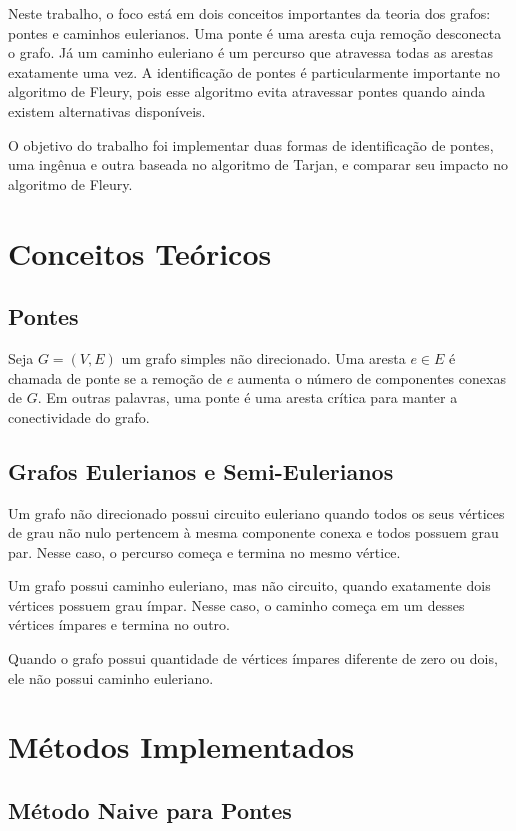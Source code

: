 \documentclass[a4paper,12pt]{article}
\begin{document}
Neste trabalho, o foco está em dois conceitos importantes da teoria dos grafos: pontes e caminhos eulerianos. Uma ponte é uma aresta cuja remoção desconecta o grafo. Já um caminho euleriano é um percurso que atravessa todas as arestas exatamente uma vez. A identificação de pontes é particularmente importante no algoritmo de Fleury, pois esse algoritmo evita atravessar pontes quando ainda existem alternativas disponíveis.

O objetivo do trabalho foi implementar duas formas de identificação de pontes, uma ingênua e outra baseada no algoritmo de Tarjan, e comparar seu impacto no algoritmo de Fleury.

\section{Conceitos Teóricos}

\subsection{Pontes}

Seja $G=(V,E)$ um grafo simples não direcionado. Uma aresta $e \in E$ é chamada de ponte se a remoção de $e$ aumenta o número de componentes conexas de $G$. Em outras palavras, uma ponte é uma aresta crítica para manter a conectividade do grafo.

\subsection{Grafos Eulerianos e Semi-Eulerianos}

Um grafo não direcionado possui circuito euleriano quando todos os seus vértices de grau não nulo pertencem à mesma componente conexa e todos possuem grau par. Nesse caso, o percurso começa e termina no mesmo vértice.

Um grafo possui caminho euleriano, mas não circuito, quando exatamente dois vértices possuem grau ímpar. Nesse caso, o caminho começa em um desses vértices ímpares e termina no outro.

Quando o grafo possui quantidade de vértices ímpares diferente de zero ou dois, ele não possui caminho euleriano.

\section{Métodos Implementados}

\subsection{Método Naive para Pontes}
\end{document}
